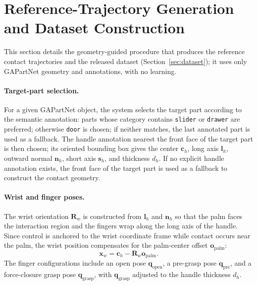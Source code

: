 \documentclass{llmxive}
\begin{document}
\section{Reference-Trajectory Generation and Dataset Construction}
\label{sec:trajgen}

This section details the geometry-guided procedure that produces the reference contact trajectories and the released dataset (Section~\ref{sec:dataset}); it uses only GAPartNet geometry and annotations, with no learning.

\paragraph{Target-part selection.}
For a given GAPartNet object, the system selects the target part
according to the semantic annotation: parts whose category contains
\texttt{slider} or \texttt{drawer} are preferred; otherwise
\texttt{door} is chosen; if neither matches, the last annotated part
is used as a fallback. The handle annotation nearest the front face
of the target part is then chosen; its oriented bounding box gives the
center $\mathbf{c}_h$, long axis $\mathbf{l}_h$, outward normal
$\mathbf{n}_h$, short axis $\mathbf{s}_h$, and thickness $d_h$. If
no explicit handle annotation exists, the front face of the target
part is used as a fallback to construct the contact geometry.

\paragraph{Wrist and finger poses.}
The wrist orientation $\mathbf{R}_w$ is constructed from
$\mathbf{l}_h$ and $\mathbf{n}_h$ so that the palm faces the
interaction region and the fingers wrap along the long axis of the
handle. Since control is anchored to the wrist coordinate frame
while contact occurs near the palm, the wrist position compensates
for the palm-center offset $\mathbf{o}_{\mathrm{palm}}$:
\begin{equation}
\mathbf{x}_w = \mathbf{c}_h - \mathbf{R}_w \mathbf{o}_{\mathrm{palm}}.
\end{equation}
The finger configurations include an open pose
$\mathbf{q}_{\mathrm{open}}$, a pre-grasp pose
$\mathbf{q}_{\mathrm{pre}}$, and a force-closure grasp pose
$\mathbf{q}_{\mathrm{grasp}}$, with $\mathbf{q}_{\mathrm{grasp}}$
adjusted to the handle thickness $d_h$.
\end{document}
